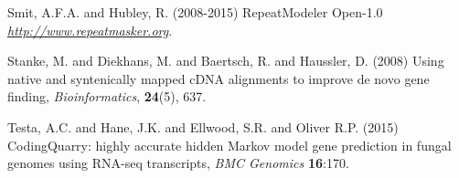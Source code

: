\documentclass[a4paper,10pt]{report}
\begin{document}
\begin{thebibliography}{}
 Smit, A.F.A. and Hubley, R. (2008-2015) RepeatModeler Open-1.0 \textit{\url{http://www.repeatmasker.org}}.

Stanke, M. and Diekhans, M. and Baertsch, R. and Haussler, D. (2008) Using native and syntenically mapped cDNA alignments to improve de novo gene finding, \textit{Bioinformatics}, \textbf{24}(5), 637.

 Testa, A.C. and Hane, J.K. and Ellwood, S.R. and Oliver R.P. (2015) CodingQuarry: highly accurate hidden Markov model gene prediction in fungal genomes using RNA-seq transcripts, \textit{BMC Genomics} \textbf{16}:170.

\end{thebibliography}
\end{document}
